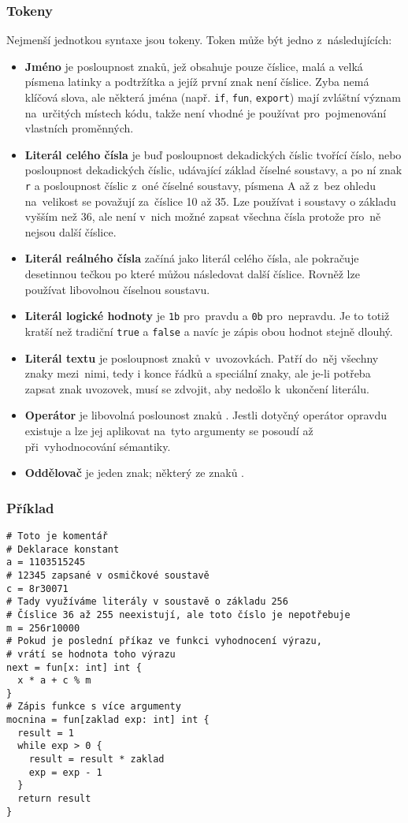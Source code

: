 \documentclass[a4paper,12pt]{article}
\def\circumflex{\char`\^}
\begin{document}
\subsubsection{Tokeny}
Nejmenší jednotkou syntaxe jsou tokeny. Token může být jedno z~následujících:
\begin{itemize}
\item \textbf{Jméno} je posloupnost znaků, jež obsahuje pouze číslice, malá a velká písmena latinky a podtržítka a jejíž první znak není číslice. Zyba nemá klíčová slova, ale některá jména (např. \texttt{if}, \texttt{fun}, \texttt{export}) mají zvláštní význam na~určitých místech kódu, takže není vhodné je používat pro~pojmenování vlastních proměnných.
\item \textbf{Literál celého čísla} je buď posloupnost dekadických číslic tvořící číslo, nebo posloupnost dekadických číslic, udávající základ číselné soustavy, a po ní znak \texttt{r} a posloupnost číslic z~oné číselné soustavy, písmena A až z~bez ohledu na~velikost se považují za~číslice 10 až 35. Lze používat i soustavy o základu vyšším než 36, ale není v~nich možné zapsat všechna čísla protože pro~ně nejsou další číslice.
\item \textbf{Literál reálného čísla} začíná jako literál celého čísla, ale pokračuje desetinnou tečkou po které můžou následovat další číslice. Rovněž lze používat libovolnou číselnou soustavu.
\item \textbf{Literál logické hodnoty} je \texttt{1b} pro~pravdu a \texttt{0b} pro~nepravdu. Je to totiž kratší než tradiční \texttt{true} a \texttt{false} a navíc je zápis obou hodnot stejně dlouhý.
\item \textbf{Literál textu} je posloupnost znaků v~uvozovkách. Patří do~něj všechny znaky mezi~nimi, tedy i konce řádků a speciální znaky, ale je-li potřeba zapsat znak uvozovek, musí se zdvojit, aby nedošlo k~ukončení literálu.
\item \textbf{Operátor} je libovolná poslounost znaků \uv{\texttt{+-*/\%\&|\textasciitilde\circumflex<>=!}}. Jestli dotyčný operátor opravdu existuje a lze jej aplikovat na~tyto argumenty se posoudí až při~vyhodnocování sémantiky.
\item \textbf{Oddělovač} je jeden znak; některý ze znaků .
\end{itemize}

\subsubsection{Příklad}
\begin{verbatim}
# Toto je komentář
# Deklarace konstant
a = 1103515245
# 12345 zapsané v osmičkové soustavě
c = 8r30071
# Tady využíváme literály v soustavě o základu 256
# Číslice 36 až 255 neexistují, ale toto číslo je nepotřebuje
m = 256r10000
# Pokud je poslední příkaz ve funkci vyhodnocení výrazu,
# vrátí se hodnota toho výrazu
next = fun[x: int] int {
  x * a + c % m
}
# Zápis funkce s více argumenty
mocnina = fun[zaklad exp: int] int {
  result = 1
  while exp > 0 {
    result = result * zaklad
    exp = exp - 1
  }
  return result
}
\end{verbatim}
\end{document}
